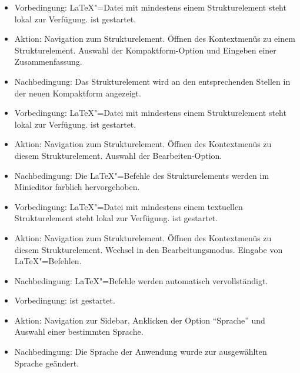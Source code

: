 \begin{itemize}
  \item Vorbedingung: \LaTeX"=Datei mit mindestens einem Strukturelement steht lokal zur Verfügung.
  \texla{} ist gestartet.
  \item Aktion: Navigation zum Strukturelement.
  Öffnen des Kontextmenüs zu einem Strukturelement.
  Auswahl der Kompaktform-Option und Eingeben einer Zusammenfassung.
  \item Nachbedingung: Das Strukturelement wird an den entsprechenden Stellen in der neuen Kompaktform angezeigt.
\end{itemize}

\clearpage

\begin{itemize}
  \item Vorbedingung: \LaTeX"=Datei mit mindestens einem Strukturelement steht lokal zur Verfügung.
  \texla{} ist gestartet.
  \item Aktion: Navigation zum Strukturelement.
  Öffnen des Kontextmenüs zu diesem Strukturelement.
  Auswahl der Bearbeiten-Option.
  \item Nachbedingung: Die \LaTeX"=Befehle des Strukturelements werden im Minieditor farblich hervorgehoben.
\end{itemize}

\begin{itemize}
  \item Vorbedingung: \LaTeX"=Datei mit mindestens einem textuellen Strukturelement steht lokal zur Verfügung.
  \texla{} ist gestartet.
  \item Aktion: Navigation zum Strukturelement.
  Öffnen des Kontextmenüs zu diesem Strukturelement.
  Wechsel in den Bearbeitungsmodus.
  Eingabe von \LaTeX"=Befehlen.
  \item Nachbedingung: \LaTeX"=Befehle werden automatisch vervollständigt.
\end{itemize}

\begin{itemize}
  \item Vorbedingung: \texla{} ist gestartet.
  \item Aktion: Navigation zur Sidebar, Anklicken der Option \enquote{Sprache} und Auswahl einer bestimmten Sprache.
  \item Nachbedingung: Die Sprache der Anwendung wurde zur ausgewählten Sprache geändert.
\end{itemize}

